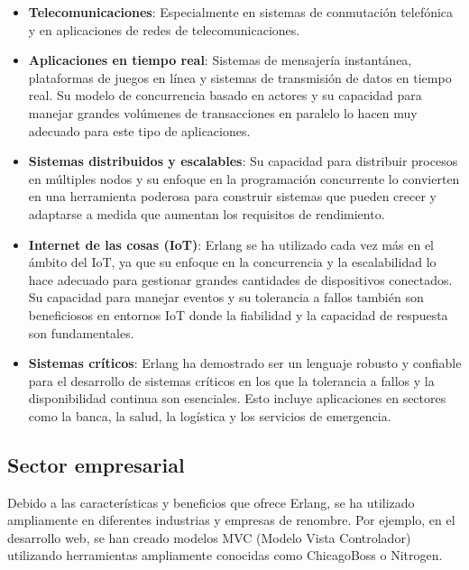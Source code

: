 \begin{itemize}

    \item \textbf{Telecomunicaciones}: Especialmente en sistemas de conmutación telefónica y en aplicaciones de redes de telecomunicaciones.
    
    \item \textbf{Aplicaciones en tiempo real}:  Sistemas de mensajería instantánea, plataformas de juegos en línea y sistemas de transmisión de datos en tiempo real. Su modelo de concurrencia basado en actores y su capacidad para manejar grandes volúmenes de transacciones en paralelo lo hacen muy adecuado para este tipo de aplicaciones.
    
    \item \textbf{Sistemas distribuidos y escalables}: Su capacidad para distribuir procesos en múltiples nodos y su enfoque en la programación concurrente lo convierten en una herramienta poderosa para construir sistemas que pueden crecer y adaptarse a medida que aumentan los requisitos de rendimiento.
    
    \item \textbf{Internet de las cosas (IoT)}: Erlang se ha utilizado cada vez más en el ámbito del IoT, ya que su enfoque en la concurrencia y la escalabilidad lo hace adecuado para gestionar grandes cantidades de dispositivos conectados. Su capacidad para manejar eventos y su tolerancia a fallos también son beneficiosos en entornos IoT donde la fiabilidad y la capacidad de respuesta son fundamentales.
    
    \item \textbf{Sistemas críticos}:  Erlang ha demostrado ser un lenguaje robusto y confiable para el desarrollo de sistemas críticos en los que la tolerancia a fallos y la disponibilidad continua son esenciales. Esto incluye aplicaciones en sectores como la banca, la salud, la logística y los servicios de emergencia.
\end{itemize}




\subsection{Sector empresarial}

Debido a las características y beneficios que ofrece Erlang, se ha utilizado ampliamente en diferentes industrias y empresas de renombre. Por ejemplo, en el desarrollo web, se han creado modelos MVC (Modelo Vista Controlador) utilizando herramientas ampliamente conocidas como ChicagoBoss o Nitrogen.

